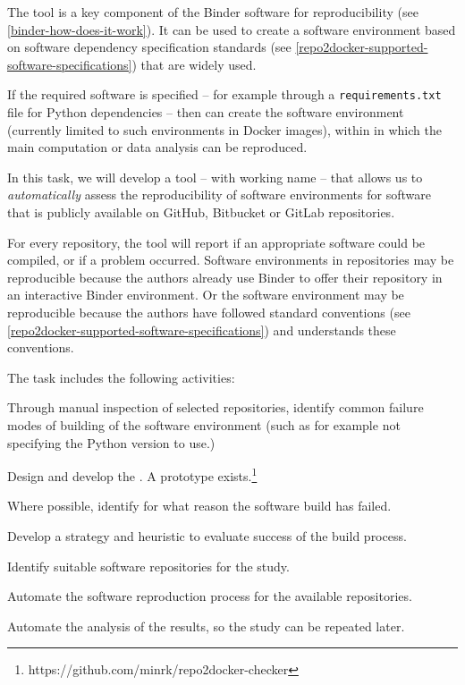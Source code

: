 \begin{task}[
  title=Towards quantifiable progress for reproducible software environments,
  id=repo2docker-checker,
  lead=SRL,
  PM=10,
  wphases={0-24!0.28},
  partners={MP}
  ]
  The \repotodocker{} tool is a key component of the Binder software for
  reproducibility (see \ref{binder-how-does-it-work}). It can be used to create
  a software environment based on software dependency specification standards
  (see \ref{repo2docker-supported-software-specifications}) that are widely used.

  If the required software is specified -- for example through a
  \texttt{requirements.txt} file for Python dependencies -- then \repotodocker{}
  can create the software environment (currently limited to such environments in
  Docker images), within in which the main computation or data analysis can be
  reproduced.

  In this task, we will develop a tool -- with working name
   -- that allows us to \emph{automatically}
  assess the reproducibility of software environments for software that is
  publicly available on GitHub, Bitbucket or GitLab repositories.

  For every repository, the  tool will report if an
  appropriate software could be compiled, or if a problem occurred. Software
  environments in repositories may be reproducible because the authors already
  use Binder to offer their repository in an interactive Binder environment. Or
  the software environment may be reproducible because the authors have followed
  standard conventions (see \ref{repo2docker-supported-software-specifications})
  and \repotodocker{} understands these conventions.

The task includes the following activities:
\begin{compactitem}
  \item Through manual inspection of selected repositories, identify common
    failure modes of building of the software environment (such as for example
    not specifying the Python version to use.)
  \item Design and develop the . A prototype
    exists.\footnote{https://github.com/minrk/repo2docker-checker}
  \item Where possible, identify for what reason the software build has failed.
  \item Develop a strategy and heuristic to evaluate success of the build
    process.
  \item Identify suitable software repositories for the study.
  \item Automate the software reproduction process for the available
    repositories.
  \item Automate the analysis of the results, so the study can be repeated later.
  \end{compactitem}


\end{task}
